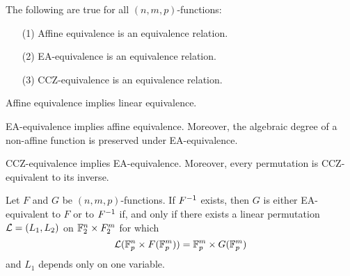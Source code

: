 \begin{proposition}\label{proposition_1.1.5}
  The following are true for all $(n,m,p)$-functions:
  \begin{enumerate}
    \item[(1)] Affine equivalence is an equivalence relation.

    \item[(2)] EA-equivalence is an equivalence relation.

    \item[(3)] CCZ-equivalence is an equivalence relation.
  \end{enumerate}
\end{proposition}
\begin{corollary}
  Affine equivalence implies linear equivalence.
\end{corollary}
\begin{corollary}
  EA-equivalence implies affine equivalence. Moreover, the algebraic degree of a
  non-affine function is preserved under EA-equivalence.
\end{corollary}
\begin{corollary}
  CCZ-equivalence implies EA-equivalence. Moreover, every permutation is
  CCZ-equivalent to its inverse.
\end{corollary}

\begin{proposition}\label{proposition_1.1.6}
  Let $F$ and  $G$ be $(n,m,p)$-functions. If $F^{-1}$ exists, then $G$ is
  either EA-equivalent to $F$ or to $F^{-1}$ if, and only if there exists a
  linear permutation $\mathcal{L}=(L_1,L_2)$ on $\mathbb{F}_2^n \times F_2^m$ for which
  \begin{equation*}
    \mathcal{L}(\mathbb{F}_p^n \times F(\mathbb{F}_p^m))=\mathbb{F}_p^m \times G(\mathbb{F}_p^m)
  \end{equation*}
  and $L_1$ depends only on one variable.
\end{proposition}
